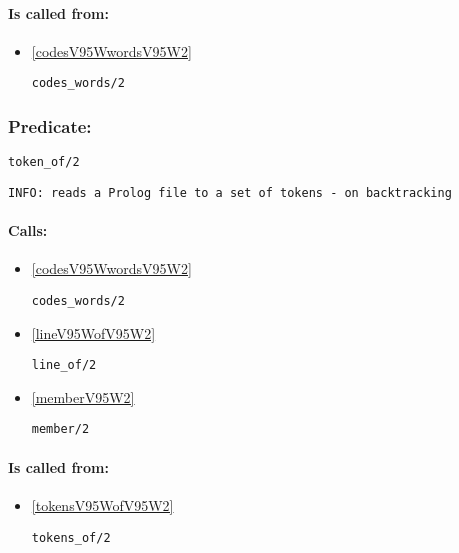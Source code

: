\paragraph{Is called from:} 
\begin{itemize}
\item \ref{codesV95WwordsV95W2} 
\begin{verbatim}
codes_words/2
\end{verbatim}

\end{itemize}

\subsubsection{Predicate:} \label{tokenV95WofV95W2}

\begin{verbatim}
token_of/2
\end{verbatim}

{\small \begin{verbatim}
INFO: reads a Prolog file to a set of tokens - on backtracking

\end{verbatim}}
\paragraph{Calls:} 
\begin{itemize}
\item \ref{codesV95WwordsV95W2} 
\begin{verbatim}
codes_words/2
\end{verbatim}

\item \ref{lineV95WofV95W2} 
\begin{verbatim}
line_of/2
\end{verbatim}

\item \ref{memberV95W2} 
\begin{verbatim}
member/2
\end{verbatim}

\end{itemize}
\paragraph{Is called from:} 
\begin{itemize}
\item \ref{tokensV95WofV95W2} 
\begin{verbatim}
tokens_of/2
\end{verbatim}

\end{itemize}

